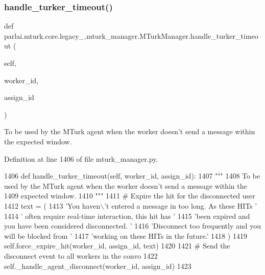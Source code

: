 \subsubsection{\texorpdfstring{handle\+\_\+turker\+\_\+timeout()}{handle\_turker\_timeout()}}
{\footnotesize\ttfamily def parlai.\+mturk.\+core.\+legacy\+\_.\+mturk\+\_\+manager.\+M\+Turk\+Manager.\+handle\+\_\+turker\+\_\+timeout (\begin{DoxyParamCaption}\item[{}]{self,  }\item[{}]{worker\+\_\+id,  }\item[{}]{assign\+\_\+id }\end{DoxyParamCaption})}

\begin{DoxyVerb}To be used by the MTurk agent when the worker doesn't send a message within the
expected window.
\end{DoxyVerb}
 

Definition at line 1406 of file mturk\+\_\+manager.\+py.


\begin{DoxyCode}
1406     \textcolor{keyword}{def }handle\_turker\_timeout(self, worker\_id, assign\_id):
1407         \textcolor{stringliteral}{"""}
1408 \textcolor{stringliteral}{        To be used by the MTurk agent when the worker doesn't send a message within the}
1409 \textcolor{stringliteral}{        expected window.}
1410 \textcolor{stringliteral}{        """}
1411         \textcolor{comment}{# Expire the hit for the disconnected user}
1412         text = (
1413             \textcolor{stringliteral}{'You haven\(\backslash\)'t entered a message in too long. As these HITs '}
1414             \textcolor{stringliteral}{' often require real-time interaction, this hit has '}
1415             \textcolor{stringliteral}{'been expired and you have been considered disconnected. '}
1416             \textcolor{stringliteral}{'Disconnect too frequently and you will be blocked from '}
1417             \textcolor{stringliteral}{'working on these HITs in the future.'}
1418         )
1419         self.force\_expire\_hit(worker\_id, assign\_id, text)
1420 
1421         \textcolor{comment}{# Send the disconnect event to all workers in the convo}
1422         self.\_handle\_agent\_disconnect(worker\_id, assign\_id)
1423 
\end{DoxyCode}
\mbox{\label{classparlai_1_1mturk_1_1core_1_1legacy__2018_1_1mturk__manager_1_1MTurkManager_a8e5ffeec12e9e02e9d688d6c85a7ade2}} 
